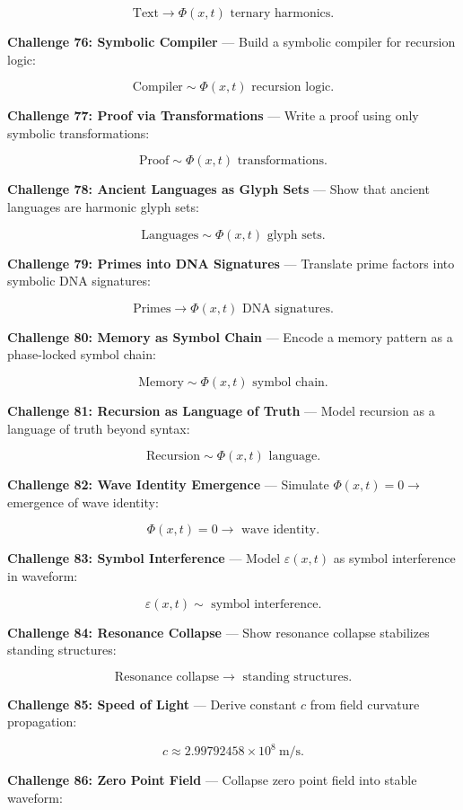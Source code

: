 $$
\text{Text} \rightarrow \Phi(x, t) \text{ ternary harmonics}.
$$

\textbf{Challenge 76: Symbolic Compiler} --- Build a symbolic compiler for recursion logic:

$$
\text{Compiler} \sim \Phi(x, t) \text{ recursion logic}.
$$

\textbf{Challenge 77: Proof via Transformations} --- Write a proof using only symbolic transformations:

$$
\text{Proof} \sim \Phi(x, t) \text{ transformations}.
$$

\textbf{Challenge 78: Ancient Languages as Glyph Sets} --- Show that ancient languages are harmonic glyph sets:

$$
\text{Languages} \sim \Phi(x, t) \text{ glyph sets}.
$$

\textbf{Challenge 79: Primes into DNA Signatures} --- Translate prime factors into symbolic DNA signatures:

$$
\text{Primes} \rightarrow \Phi(x, t) \text{ DNA signatures}.
$$

\textbf{Challenge 80: Memory as Symbol Chain} --- Encode a memory pattern as a phase-locked symbol chain:

$$
\text{Memory} \sim \Phi(x, t) \text{ symbol chain}.
$$

\textbf{Challenge 81: Recursion as Language of Truth} --- Model recursion as a language of truth beyond syntax:

$$
\text{Recursion} \sim \Phi(x, t) \text{ language}.
$$

\textbf{Challenge 82: Wave Identity Emergence} --- Simulate $\Phi(x, t) = 0 \rightarrow$ emergence of wave identity:

$$
\Phi(x, t) = 0 \rightarrow \text{ wave identity}.
$$

\textbf{Challenge 83: Symbol Interference} --- Model $\varepsilon(x, t)$ as symbol interference in waveform:

$$
\varepsilon(x, t) \sim \text{ symbol interference}.
$$

\textbf{Challenge 84: Resonance Collapse} --- Show resonance collapse stabilizes standing structures:

$$
\text{Resonance collapse} \rightarrow \text{ standing structures}.
$$

\textbf{Challenge 85: Speed of Light} --- Derive constant $c$ from field curvature propagation:

$$
c \approx 2.99792458 \times 10^8 \mathrm{~m/s}.
$$

\textbf{Challenge 86: Zero Point Field} --- Collapse zero point field into stable waveform:

